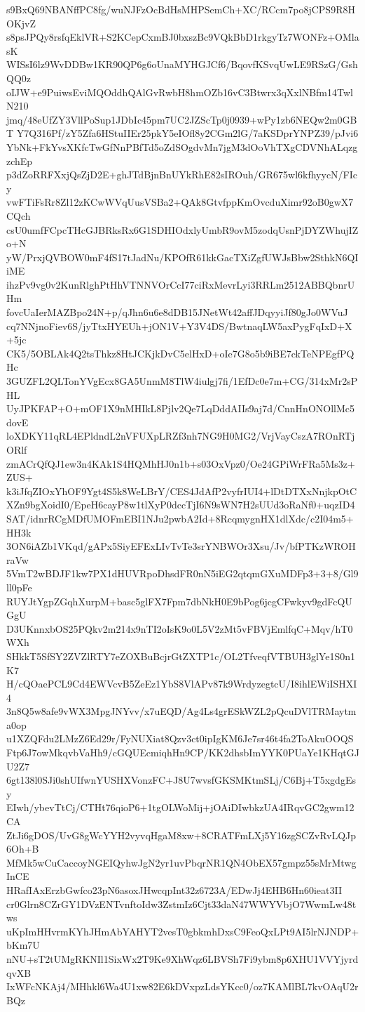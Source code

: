 s9BxQ69NBANffPC8fg/wuNJFzOcBdHsMHPSemCh+XC/RCcm7po8jCPS9R8HOKjvZ
s8psJPQy8rsfqEklVR+S2KCepCxmBJ0bxszBc9VQkBbD1rkgyTz7WONFz+OMlasK
WISsI6lz9WvDDBw1KR90QP6g6oUnaMYHGJCf6/BqovfKSvqUwLE9RSzG/GshQQ0z
oIJW+e9PuiwsEviMQOddhQAlGvRwbH8hmOZb16vC3Btwrx3qXxlNBfm14TwlN210
jmq/48eUfZY3VllPoSup1JDbIc45pm7UC2JZScTp0j0939+wPy1zb6NEQw2m0GBT
Y7Q316Pf/zY5Zfa6HStuIIEr25pkY5eIOfl8y2CGm2lG/7aKSDprYNPZ39/pJvi6
YbNk+FkYvsXKfcTwGfNnPBfTd5oZdSOgdvMn7jgM3dOoVhTXgCDVNhALqzgzchEp
p3dZoRRFXxjQsZjD2E+ghJTdBjnBnUYkRhE82sIROuh/GR675wl6kfhyycN/FIcy
vwFTiFsRr8Zl12zKCwWVqUusVSBa2+QAk8GtvfppKmOvcduXimr92oB0gwX7CQch
csU0umfFCpcTHcGJBRksRx6G1SDHIOdxlyUmbR9ovM5zodqUsnPjDYZWhujIZo+N
yW/PrxjQVBOW0mF4fS17tJadNu/KPOfR61kkGacTXiZgfUWJsBbw2SthkN6QIiME
ihzPv9vg0v2KunRlghPtHhVTNNVOrCcI77ciRxMevrLyi3RRLm2512ABBQbnrUHm
fovcUaIerMAZBpo24N+p/qJhn6u6e8dDB15JNetWt42affJDqyyiJf80gJo0WVuJ
cq7NNjnoFiev6S/jyTtxHYEUh+jON1V+Y3V4DS/BwtnaqLW5axPygFqIxD+X+5jc
CK5/5OBLAk4Q2tsThkz8HtJCKjkDvC5elHxD+oIe7G8o5b9iBE7ckTeNPEgfPQHc
3GUZFL2QLTonYVgEcx8GA5UnmM8TlW4iulgj7fi/1EfDc0e7m+CG/314xMr2sPHL
UyJPKFAP+O+mOF1X9nMHIkL8Pjlv2Qe7LqDddAIIs9aj7d/CnnHnONOllMc5dovE
loXDKY11qRL4EPldndL2nVFUXpLRZf3nh7NG9H0MG2/VrjVayCszA7ROnRTjORlf
zmACrQfQJ1ew3n4KAk1S4HQMhHJ0n1b+s03OxVpz0/Oe24GPiWrFRa5Ms3z+ZUS+
k3iJfqZIOxYhOF9Ygt4S5k8WeLBrY/CES4JdAfP2vyfrIUI4+lDtDTXxNnjkpOtC
XZn9bgXoidI0/EpeH6cayP8w1tlXyP0dccTjI6N9sWN7H2sUUd3oRaNf0+uqzID4
SAT/idnrRCgMDfUMOFmEBI1NJu2pwbA2Id+8RcqmygnHX1dlXdc/c2I04m5+HH3k
3ON6iAZb1VKqd/gAPx5SiyEFExLIvTvTe3srYNBWOr3Xsu/Jv/bfPTKzWROHraVw
5VmT2wBDJF1kw7PX1dHUVRpoDhsdFR0nN5iEG2qtqmGXuMDFp3+3+8/Gl9ll0pFe
RUYJtYgpZGqhXurpM+basc5glFX7Fpm7dbNkH0E9bPog6jcgCFwkyv9gdFcQUGgU
D3UKnnxbOS25PQkv2m214x9nTI2oIsK9o0L5V2zMt5vFBVjEmlfqC+Mqv/hT0WXh
SHkkT5SfSY2ZVZlRTY7eZOXBuBcjrGtZXTP1c/OL2TfveqfVTBUH3glYe1S0n1K7
H/cQOaePCL9Cd4EWVcvB5ZeEz1YbS8VlAPv87k9WrdyzegtcU/I8ihlEWiISHXI4
3n8Q5w8afe9vWX3MpgJNYvv/x7uEQD/Ag4Ls4grESkWZL2pQcuDVlTRMaytma0op
u1XZQFdu2LMzZ6Ed29r/FyNUXiat8Qzv3ct0ipIgKM6Je7sr46t4fa2ToAkuOOQS
Ftp6J7owMkqvbVaHh9/cGQUEcmiqhHn9CP/KK2dhsbImYYK0PUaYe1KHqtGJU2Z7
6gt138l0SJi0shUIfwnYUSHXVonzFC+J8U7wvsfGKSMKtmSLj/C6Bj+T5xgdgEsy
EIwh/ybevTtCj/CTHt76qioP6+1tgOLWoMij+jOAiDIwbkzUA4IRqvGC2gwm12CA
ZtJi6gDOS/UvG8gWcYYH2vyvqHgaM8xw+8CRATFmLXj5Y16zgSCZvRvLQJp6Oh+B
MfMk5wCuCaccoyNGEIQyhwJgN2yr1uvPbqrNR1QN4ObEX57gmpz55sMrMtwgInCE
HRafIAxErzbGwfco23pN6asoxJHwcqpInt32z6723A/EDwJj4EHB6Hn60ieat3II
cr0Glrn8CZrGY1DVzENTvnftoIdw3ZstmIz6Cjt33daN47WWYVbjO7WwmLw48tws
uKpImHHvrmKYhJHmAbYAHYT2vesT0gbkmhDxsC9FeoQxLPt9AI5lrNJNDP+bKm7U
nNU+sT2tUMgRKNIl1SixWx2T9Ke9XhWqz6LBVSh7Fi9ybm8p6XHU1VVYjyrdqvXB
IxWFcNKAj4/MHhkl6Wa4U1xw82E6kDVxpzLdsYKcc0/oz7KAMlBL7kvOAqU2rBQz
